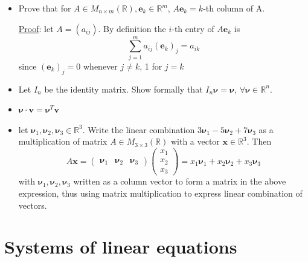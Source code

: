 \documentclass[12pt]{report}
\theoremstyle{definition}
\begin{document}
\begin{ex}
    \;

    \begin{itemize}
            \item 
                Prove that for $A \in M_{n \times m}(\mathbb{R}), \mathbf{e}_k \in \mathbb{R}^{m}$,
                $A\mathbf{e}_k = k$-th column of A.
    
                \underline{Proof}: let $A = (a_{ij})$. By definition the $i$-th entry of $A\mathbf{e}_k$ is\[
                    \sum_{j=1}^{m} a_{ij}{(\mathbf{e}_k)}_j = a_{ik}
                \]since $ {(\mathbf{e}_k)}_j = 0$ whenever $j \neq k$, 1 for $j = k$
            \item Let $I_n$ be the identity matrix. Show formally that $I_n \mathbf{\nu} = \mathbf{\nu}$, $\forall \mathbf{\nu} \in \mathbb{R}^{n}$.
            \item $\mathbf{\nu} \cdot \mathbf{v} = \mathbf{\nu}^{T} \mathbf{v}$
            \item let $\mathbf{\nu}_1, \mathbf{\nu}_2, \mathbf{\nu}_3 \in \mathbb{R}^{3}$.
                Write the linear combination $3\mathbf{\nu}_1 - 5\mathbf{\nu}_2 + 7\mathbf{\nu}_3$ as a multiplication of matrix
                $A \in M_{3 \times 3}(\mathbb{R})$ with a vector $\mathbf{x} \in \mathbb{R}^{3}$. Then\[
                    A\mathbf{x} = \begin{pmatrix}
                        \mathbf{\nu}_1 & \mathbf{\nu}_2 & \mathbf{\nu}_3
                    \end{pmatrix} 
                    \begin{pmatrix}
                            x_1 \\
                            x_2 \\
                            x_3
                    \end{pmatrix} 
                    = x_1\mathbf{\nu}_1 + x_2\mathbf{\nu}_2 + x_3\mathbf{\nu}_3
                \]
                with $\mathbf{\nu}_1, \mathbf{\nu}_2, \mathbf{\nu}_3$ written as a column vector to form a matrix
                in the above expression, thus using matrix multiplication to express linear combination of vectors.
    \end{itemize}
    
\end{ex}

\section{Systems of linear equations}
\end{document}
